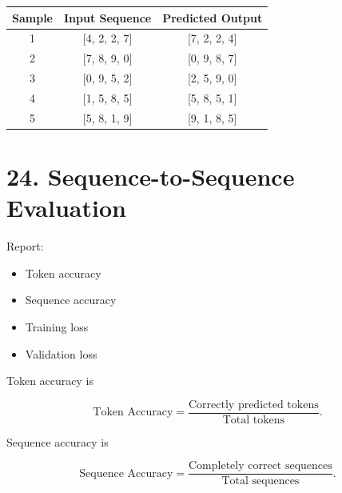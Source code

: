 \documentclass[10pt]{article}
\begin{document}

\begin{center}

\begin{tabular}{|c|c|c|}
\hline
\textbf{Sample} & \textbf{Input Sequence} & \textbf{Predicted Output} \\
\hline
1 & [4, 2, 2, 7] & [7, 2, 2, 4] \\
\hline
2 & [7, 8, 9, 0] & [0, 9, 8, 7] \\
\hline
3 & [0, 9, 5, 2] & [2, 5, 9, 0] \\
\hline
4 & [1, 5, 8, 5] & [5, 8, 5, 1] \\
\hline
5 & [5, 8, 1, 9] & [9, 1, 8, 5] \\
\hline

\end{tabular}

\end{center}

\section*{24. Sequence-to-Sequence Evaluation}

Report:

\begin{itemize}
\item Token accuracy
\item Sequence accuracy
\item Training loss
\item Validation loss
\end{itemize}

Token accuracy is

\[
\text{Token Accuracy}
=
\frac{\text{Correctly predicted tokens}}
{\text{Total tokens}}.
\]

Sequence accuracy is

\[
\text{Sequence Accuracy}
=
\frac{\text{Completely correct sequences}}
{\text{Total sequences}}.
\]
\end{document}
